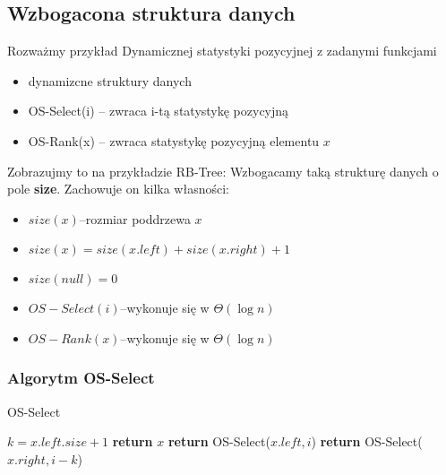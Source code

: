 \documentclass[11pt,a4paper]{article}
\begin{document}
\subsection{Wzbogacona struktura danych}
Rozważmy przykład Dynamicznej statystyki pozycyjnej z zadanymi funkcjami
\begin{itemize}
    \item dynamizcne struktury danych
    \item OS-Select(i) -- zwraca i-tą statystykę pozycyjną
    \item OS-Rank(x) -- zwraca statystykę pozycyjną elementu $x$
\end{itemize}
Zobrazujmy to na przykładzie RB-Tree:
Wzbogacamy taką strukturę danych o pole \textbf{size}. Zachowuje on kilka własności:
\begin{itemize}
    \item $size(x)$--rozmiar poddrzewa $x$
    \item $size(x) = size(x.left) + size(x.right) + 1$
    \item $size(null)=0$
    \item $OS-Select(i)$--wykonuje się w $\Theta(\log n)$
    \item $OS-Rank(x)$--wykonuje się w $\Theta(\log n)$
\end{itemize}

\subsubsection{Algorytm OS-Select}
\begin{algorithm}
    \caption{OS-Select}
    \begin{algorithmic}[1]
        \State $k=x.left.size+1$
        \State \textbf{return} $x$
        \State \textbf{return} OS-Select($x.left, i$)
        \Else
        \State \textbf{return} OS-Select($x.right, i-k$)
        \EndIf
        \EndProcedure
    \end{algorithmic}
\end{algorithm}
\end{document}

